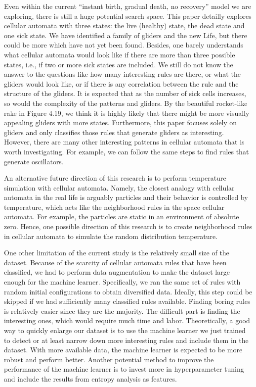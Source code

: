 \documentclass[12pt]{article}
\numberwithin{figure}{section} %
\begin{document}
Even within the current “instant birth, gradual death, no recovery” model we are exploring, there is still a huge potential search space. This paper detailly explores cellular automata with three states: the live (healthy) state, the dead state and one sick state. We have identified a family of gliders and the new Life, but there could be more which have not yet been found. Besides, one barely understands what cellular automata would look like if there are more than three possible states, i.e., if two or more sick states are included. We still do not know the answer to the questions like how many interesting rules are there, or what the gliders would look like, or if there is any correlation between the rule and the structure of the gliders. It is expected that as the number of sick cells increases, so would the complexity of the patterns and gliders. By the beautiful rocket-like rake in Figure 4.19, we think it is highly likely that there might be more visually appealing gliders with more states. Furthermore, this paper focuses solely on gliders and only classifies those rules that generate gliders as interesting. However, there are many other interesting patterns in cellular automata that is worth investigating. For example, we can follow the same steps to find rules that generate oscillators. 

An alternative future direction of this research is to perform temperature simulation with cellular automata. Namely, the closest analogy with cellular automata in the real life is arguably particles and their behavior is controlled by temperature, which acts like the neighborhood rules in the space cellular automata. For example, the particles are static in an environment of absolute zero. Hence, one possible direction of this research is to create neighborhood rules in cellular automata to simulate the random distribution temperature. 

One other limitation of the current study is the relatively small size of the dataset. Because of the scarcity of cellular automata rules that have been classified, we had to perform data augmentation to make the dataset large enough for the machine learner. Specifically, we ran the same set of rules with random initial configurations to obtain diversified data. Ideally, this step could be skipped if we had sufficiently many classified rules available. Finding boring rules is relatively easier since they are the majority. The difficult part is finding the interesting ones, which would require much time and labor. Theoretically, a good way to quickly enlarge our dataset is to use the machine learner we just trained to detect or at least narrow down more interesting rules and include them in the dataset. With more available data, the machine learner is expected to be more robust and perform better. Another potential method to improve the performance of the machine learner is to invest more in hyperparameter tuning and include the results from entropy analysis as features. 
\end{document}

